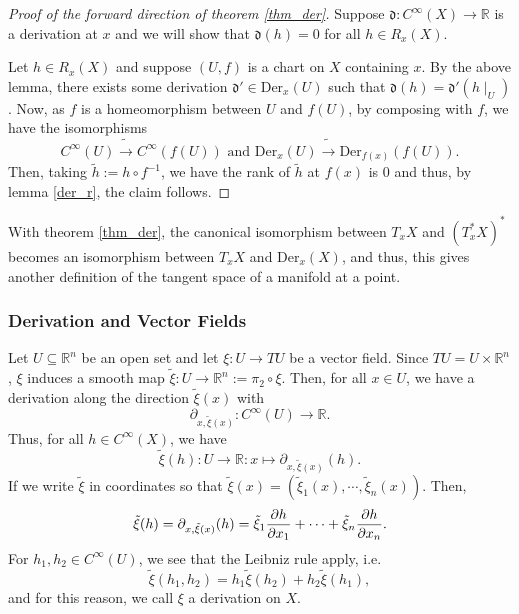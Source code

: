 \documentclass[]{article}
\theoremstyle{definition}
\theoremstyle{definition}
\begin{document}
\begin{proof}[Proof of the forward direction of theorem \ref{thm_der}]
  Suppose \(\mathfrak{d} : C^\infty(X) \to \mathbb{R}\) is a derivation at \(x\) 
  and we will show that \(\mathfrak{d}(h) = 0\) for all \(h \in R_x(X)\). 
  
  Let \(h \in R_x(X)\) and suppose \((U, f)\) is a chart on \(X\) containing 
  \(x\). By the above lemma, there exists some derivation 
  \(\mathfrak{d}' \in \text{Der}_x(U)\) such that \(\mathfrak{d}(h) = 
  \mathfrak{d}'(h\mid_U)\). Now, as \(f\) is a homeomorphism between 
  \(U\) and \(f(U)\), by composing with \(f\), we have the isomorphisms 
  \[C^\infty(U) \tilde \to C^\infty(f(U)) \text{ and } 
    \text{Der}_x(U) \tilde \to \text{Der}_{f(x)}(f(U)).\]
  Then, taking \(\tilde h := h \circ f^{-1}\), we have the rank of \(\tilde h\) 
  at \(f(x)\) is 0 and thus, by lemma \ref{der_r}, the claim follows.
\end{proof}

With theorem \ref{thm_der}, the canonical isomorphism between 
\(T_x X\) and \((T_x^* X)^*\) becomes an isomorphism between \(T_x X\) and 
\(\text{Der}_x(X)\), and thus, this gives another definition of the 
tangent space of a manifold at a point.

\subsubsection{Derivation and Vector Fields}

Let \(U \subseteq \mathbb{R}^n\) be an open set and let \(\xi : U \to TU\) be 
a vector field. Since \(TU = U \times \mathbb{R}^n\), \(\xi\) induces a smooth 
map \(\tilde \xi : U \to \mathbb{R}^n := \pi_2 \circ \xi\). Then, for all 
\(x \in U\), we have a derivation along the direction \(\tilde \xi(x)\) with 
\[\partial_{x, \tilde \xi(x)} : C^\infty(U) \to \mathbb{R}.\]
Thus, for all \(h \in C^\infty(X)\), we have 
\[\tilde \xi(h) : U \to \mathbb{R} : x \mapsto \partial_{x, \tilde \xi(x)}(h).\]
If we write \(\tilde \xi\) in coordinates so that \(\tilde \xi(x) = 
(\tilde \xi_1(x), \cdots, \tilde \xi_n(x))\). Then, 
\[\tilde \xi(h) = \partial_{x, \tilde \xi(x)}(h) = 
  \tilde \xi_1 \pdv{h}{x_1} + \cdots + \tilde \xi_n \pdv{h}{x_n}.\]
For \(h_1, h_2 \in C^\infty(U)\), we see that the Leibniz rule apply, i.e. 
\[\tilde \xi(h_1, h_2) = h_1 \tilde \xi(h_2) + h_2 \tilde \xi(h_1),\]
and for this reason, we call \(\xi\) a derivation on \(X\).
\end{document}

